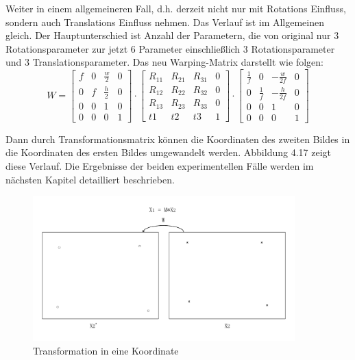 Weiter in einem allgemeineren Fall, d.h. derzeit nicht nur mit Rotations Einfluss, sondern auch Translations Einfluss nehmen. Das Verlauf ist im Allgemeinen gleich. Der Hauptunterschied ist Anzahl der Parametern, die von original nur 3 Rotationsparameter zur jetzt 6 Parameter einschließlich 3 Rotationsparameter und 3 Translationsparameter. Das neu Warping-Matrix darstellt wie folgen:
\begin{equation}
   W = \begin{bmatrix}
	f			& 0 		& \frac{w}{2}	  & 0 \\
	0	 		& f			& \frac{h}{2} 	  & 0 \\
	0     		& 0 		& 1 			  & 0 \\	
	0     		& 0 		& 0 			  & 1
	\end{bmatrix} \cdot \begin{bmatrix}
	R_{11}			& R_{21}  		& R_{31}	  & 0 \\
	R_{12}	 		& R_{22}		& R_{32}	  & 0 \\
	R_{13}     		& R_{23} 		& R_{33} 	  & 0 \\	
	t1     			& t2 			& t3 		  & 1
	\end{bmatrix} \cdot \begin{bmatrix}
	\frac{1}{f}	   & 0 				& -\frac{w}{2f}	  & 0 \\
	0	 		   & \frac{1}{f}	& -\frac{h}{2f}   & 0 \\
	0     		   & 0 		        & 1 			  & 0 \\	
	0     		   & 0 		        & 0 			  & 1
	\end{bmatrix}
\end{equation}

Dann durch Transformationsmatrix können die Koordinaten des zweiten Bildes in die Koordinaten des ersten Bildes umgewandelt werden. Abbildung 4.17 zeigt diese Verlauf. Die Ergebnisse der beiden experimentellen Fälle werden im nächsten Kapitel detailliert beschrieben. 

\begin{figure}[H]
 \centering 
 \includegraphics[keepaspectratio,width=0.9\textwidth]{images/4_ZweiteErfahrung/Kamera/Transformmatrix.pdf}
 \caption{Transformation in eine Koordinate}
 \label{fig:Transformation in eine Koordinate}
\end{figure} 

